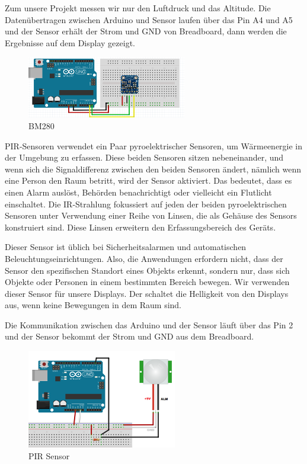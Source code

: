 \documentclass[conference]{IEEEtran}
\begin{document}
Zum unsere Projekt messen wir nur den Luftdruck und das Altitude. Die Datenübertragen zwischen Arduino und Sensor laufen über das Pin A4 und A5 und der Sensor erhält der Strom und GND von Breadboard, dann werden die Ergebnisse auf dem Display gezeigt. 

\begin{figure}
	\centering
	\includegraphics[width=0.7\linewidth]{fig28}
	\caption{BM280}
	\label{fig:fig28}
\end{figure}

PIR-Sensoren verwendet ein Paar pyroelektrischer Sensoren, um Wärmeenergie in der Umgebung zu erfassen. Diese beiden Sensoren sitzen nebeneinander, und wenn sich die Signaldifferenz zwischen den beiden Sensoren ändert, nämlich wenn eine Person den Raum betritt, wird der Sensor aktiviert. Das bedeutet, dass es einen Alarm auslöst, Behörden benachrichtigt oder vielleicht ein Flutlicht einschaltet. Die IR-Strahlung fokussiert auf jeden der beiden pyroelektrischen Sensoren unter Verwendung einer Reihe von Linsen, die als Gehäuse des Sensors konstruiert sind. Diese Linsen erweitern den Erfassungsbereich des Geräts.

Dieser Sensor ist üblich bei Sicherheitsalarmen und automatischen Beleuchtungseinrichtungen. Also, die Anwendungen erfordern nicht, dass der Sensor den spezifischen Standort eines Objekts erkennt, sondern nur, dass sich Objekte oder Personen in einem bestimmten Bereich bewegen. Wir verwenden dieser Sensor für unsere Displays. Der schaltet die Helligkeit von den Displays aus, wenn keine Bewegungen in dem Raum sind.

Die Kommunikation zwischen das Arduino und der Sensor läuft über das Pin 2 und der Sensor bekommt der Strom und GND aus dem Breadboard. 

\begin{figure}
	\centering
	\includegraphics[width=0.7\linewidth]{fig29}
	\caption{PIR Sensor}
	\label{fig:fig29}
\end{figure}
\end{document}
